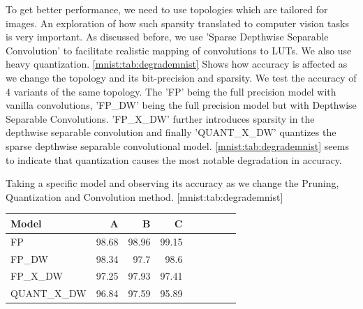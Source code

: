To get better performance, we need to use topologies which are tailored for images. An exploration of how such sparsity translated to computer vision tasks is very important. As discussed before, we use 'Sparse Depthwise Separable Convolution' to facilitate realistic mapping of convolutions to LUTs. We also use heavy quantization. \cref{mnist:tab:degrademnist} Shows how accuracy is affected as we change the topology and its bit-precision and sparsity. We test the accuracy of 4 variants of the same topology. The 'FP' being the full precision model with vanilla convolutions, 'FP\_DW' being the full precision model but with Depthwise Separable Convolutions. 'FP\_X\_DW' further introduces sparsity in the depthwise separable convolution and finally 'QUANT\_X\_DW' quantizes the sparse depthwise separable convolutional model. \cref{mnist:tab:degrademnist} seems to indicate that quantization causes the most notable degradation in accuracy. 

\begin{table}
    \begin{sidecaption}{%
        Taking a specific model and observing its accuracy as we change the Pruning, Quantization and Convolution method.
    }[mnist:tab:degrademnist]
\begin{threeparttable}
\begin{tabular}{lrrrrrrrr}
\hline
Model        & A     & B     & C     \\ \hline
FP           & 98.68 & 98.96 & 99.15 \\
FP\_DW       & 98.34 & 97.7  & 98.6  \\
FP\_X\_DW    & 97.25 & 97.93 & 97.41 \\
QUANT\_X\_DW & 96.84 & 97.59 & 95.89 \\ \hline
\end{tabular}
\end{threeparttable}
\end{sidecaption}
\end{table}

